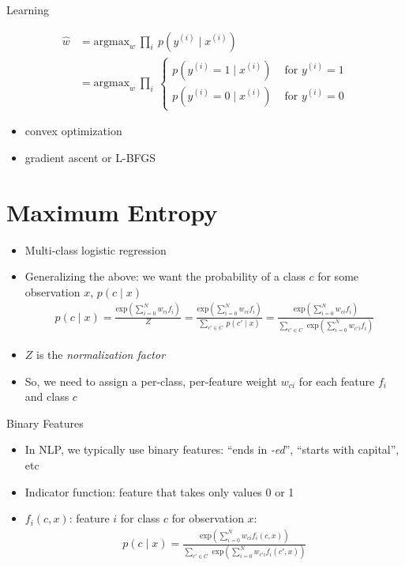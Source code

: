 \documentclass[11pt,letterpaper]{article}
\begin{document}
Learning

\begin{align*} 
  \hat{w} &= \text{argmax}_w~\prod_i~p(y^{(i)}\mid x^{(i)}) \\
          &= \text{argmax}_w~\prod_i~ \left\{
                                        \begin{array}{ll}
                                          p(y^{(i)}=1 \mid x^{(i)}) & \text{ for } y^{(i)}=1 \\
                                          p(y^{(i)}=0 \mid x^{(i)}) & \text{ for } y^{(i)}=0
                                        \end{array}
                                      \right.
\end{align*}

\begin{itemize}
  \item convex optimization
  \item gradient ascent or L-BFGS
\end{itemize}



\section{Maximum Entropy}

\begin{itemize}
  \item Multi-class logistic regression
  \item Generalizing the above: we want the probability of a class $c$ for some observation $x$, $p(c \mid x)$
    \begin{align*} 
      p(c \mid x) = \frac{\text{exp}\left(\sum_{i=0}^N w_{ci} f_i\right)}
                          {Z}
                  = \frac{\text{exp}\left(\sum_{i=0}^N w_{ci} f_i\right)}
                          {\sum_{c' \in C}~p(c' \mid x)}
                  = \frac{\text{exp}\left(\sum_{i=0}^N w_{ci} f_i\right)}
                          {\sum_{c' \in C} \text{ exp}\left(\sum_{i=0}^N w_{c'i} f_i\right)}
    \end{align*}
  \item $Z$ is the \textit{normalization factor} 
  \item So, we need to assign a per-class, per-feature weight $w_{ci}$ for each feature $f_i$ and class $c$
\end{itemize}

Binary Features

\begin{itemize}
  \item In NLP, we typically use binary features: ``ends in \textit{-ed}'', ``starts with capital'', etc
  \item Indicator function: feature that takes only values 0 or 1
  \item $f_i(c,x)$: feature $i$ for class $c$ for observation $x$:
    \begin{align*} 
      p(c \mid x) = \frac{\text{exp}\left(\sum_{i=0}^N w_{ci} f_i(c,x)\right)}
                         {\sum_{c' \in C} \text{ exp}\left(\sum_{i=0}^N w_{c'i} f_i(c',x)\right)}
    \end{align*}
\end{itemize}
\end{document}

